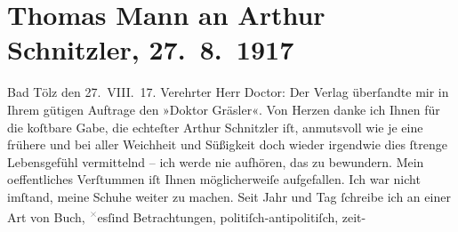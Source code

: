 

         
         \renewcommand{\erwaehntePersonen}{Personen:  Molière}
         \renewcommand{\erwaehnteInstitutionen}{Institutionen: S. Fischer Verlag}
         \renewcommand{\erwaehnteOrte}{Orte: Bad Tölz, Wien}
         \renewcommand{\erwaehnteWerke}{Werke: Betrachtungen eines Unpolitischen, Doktor Gräsler, Badearzt, Scapins Streiche}
               \section[Thomas Mann an Arthur Schnitzler, 27. 8. 1917]{ Thomas Mann an Arthur Schnitzler, 27. 8. 1917}\nopagebreak{}\rehead{ }\begin{ledgroupsized}[t]{13cm}\normalsize\beginnumbering \toendnotes[C]{\smallbreak\pagebreak[2]} 
\toendnotes[C]{\smallbreak}\pstart
           \raggedleft{}{\pb}Bad Tölz den
                  27. VIII. 17.\pend
           \pstart{}Verehrter Herr Doctor:\pend\pstart
           Der Verlag überſandte mir in Ihrem
               gütigen Auftrage den »Doktor Gräsler«. Von Herzen
               danke ich Ihnen für die koſtbare Gabe, die echteſter Arthur Schnitzler iſt,
               anmutsvoll wie je eine frühere und bei aller Weichheit und Süßigkeit doch wieder  irgendwie dies ſtrenge Lebensgefühl vermittelnd –
               ich werde nie aufhören, das zu bewundern.\pend
           \pstart
           Mein oeffentliches Verſtummen iſt Ihnen {\pb}möglicherweiſe aufgefallen. Ich war nicht imſtand, meine Schuhe weiter zu machen.
               Seit Jahr und Tag ſchreibe ich an einer Art von Buch, \substVorne{}\textsuperscript{\textcolor{gray}{×}}\substDazwischen{}es\substHinten{}{ }ſind Betrachtungen, politiſch-antipolitiſch, zeit-

\end{ledgroupsized}
